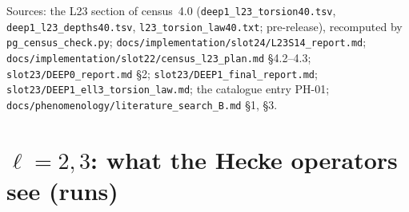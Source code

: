 \documentclass[11pt]{article}
\newcommand{\file}[1]{\texttt{#1}}
\newcommand{\pfile}[1]{\nolinkurl{#1}}
\begin{document}
\noindent Sources: the L23 section of census~4.0 (\pfile{deep1_l23_torsion40.tsv}, \pfile{deep1_l23_depths40.tsv},
\pfile{l23_torsion_law40.txt}; pre-release), recomputed by \file{pg\_census\_check.py}; \pfile{docs/implementation/slot24/L23S14_report.md}; \pfile{docs/implementation/slot22/census_l23_plan.md} \S4.2--4.3; \pfile{slot23/DEEP0_report.md} \S2;
\pfile{slot23/DEEP1_final_report.md}; \pfile{slot23/DEEP1_ell3_torsion_law.md}; the catalogue entry PH-01;
\pfile{docs/phenomenology/literature_search_B.md} \S1, \S3.

\section{\texorpdfstring{$\ell=2,3$}{l=2,3}: what the Hecke operators see (runs)}\label{sec:pg-l23}
\end{document}
